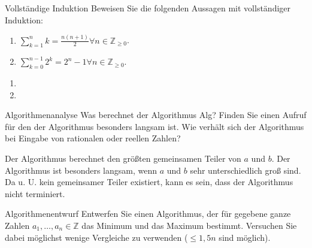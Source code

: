 \documentclass{article}
\begin{document}
\begin{exercise}{Vollständige Induktion}
  Beweisen Sie die folgenden Aussagen mit vollständiger Induktion:
  \begin{enumerate}
    \item $\sum_{k=1}^{n}{k} = \frac{n(n+1)}{2}\forall n \in \mathbb{Z}_{\ge 0}$.
    \item $\sum_{k=0}^{n-1} 2^k = 2^n-1\forall n \in \mathbb{Z}_{\ge 0}$.
  \end{enumerate}

  \begin{solution}
    \begin{enumerate}
      \item {}
      \item {}
    \end{enumerate}
  \end{solution}
\end{exercise}

\begin{exercise}{Algorithmenanalyse}
  Was berechnet der Algorithmus Alg? Finden Sie einen Aufruf für den der Algorithmus besonders langsam ist. Wie verhält sich der Algorithmus bei Eingabe von rationalen oder reellen Zahlen?
  

  \begin{solution}
    Der Algorithmus berechnet den größten gemeinsamen Teiler von $a$ und $b$. Der Algorithmus ist besonders langsam, wenn $a$ und $b$ sehr unterschiedlich groß sind. Da u. U. kein gemeinsamer Teiler existiert, kann es sein, dass der Algorithmus nicht terminiert.
  \end{solution}
\end{exercise}

\begin{exercise}{Algorithmenentwurf}
  Entwerfen Sie einen Algorithmus, der für gegebene ganze Zahlen $a_1, \ldots, a_n \in \mathbb{Z}$ das Minimum und das Maximum bestimmt. Versuchen Sie dabei möglichst wenige Vergleiche zu verwenden ($\leq 1,5n$ sind möglich).

  \begin{solution}
    
  \end{solution}
\end{exercise}
\end{document}
